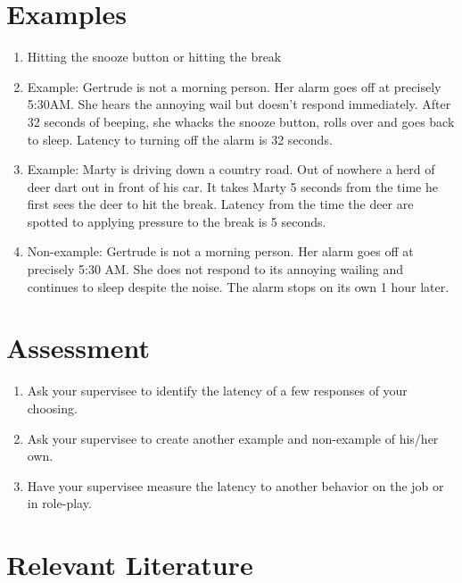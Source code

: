 \section{Examples}
\begin{enumerate}
\item Hitting the snooze button or hitting the break
\item Example: Gertrude is not a morning person.  Her alarm goes off at precisely 5:30AM.  She hears the annoying wail but doesn't respond immediately.  After 32 seconds of beeping, she whacks the snooze button, rolls over and goes back to sleep.  Latency to turning off the alarm is 32 seconds.
\item Example:  Marty is driving down a country road.  Out of nowhere a herd of deer dart out in front of his car.  It takes Marty 5 seconds from the time he first sees the deer to hit the break.  Latency from the time the deer are spotted to applying pressure to the break is 5 seconds.    
\item Non-example: Gertrude is not a morning person.  Her alarm goes off at precisely 5:30 AM.  She does not respond to its annoying wailing and continues to sleep despite the noise.  The alarm stops on its own 1 hour later.
\end{enumerate}
%
\section{Assessment}
\begin{enumerate}
\item Ask your supervisee to identify the latency of a few responses of your choosing.  
\item Ask your supervisee to create another example and non-example of his/her own.
\item Have your supervisee measure the latency to another behavior on the job or in role-play.
\end{enumerate}
%
\section{Relevant Literature}
\begin{refsection}
\nocite{test,alang2017police,clayton2018black}
\printbibliography[heading=none]
\end{refsection}

